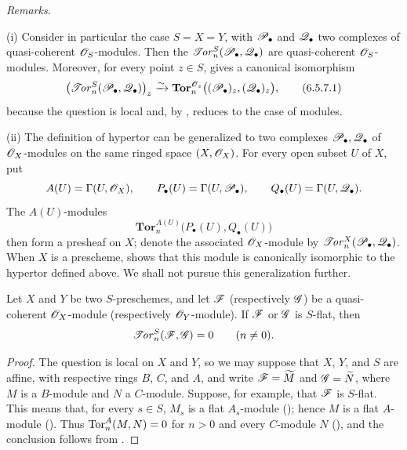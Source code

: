 \begin{env}[6.5.7]
\label{III.6.5.7}
\emph{Remarks.}

\textnormal{(i)} Consider in particular the case $S=X=Y$, with
$\mathscr{P}_\bullet$ and $\mathscr{Q}_\bullet$ two complexes of
quasi-coherent $\mathscr{O}_S$-modules.  Then the
$\mathscr{T}\!\mathit{or}_n^S(\mathscr{P}_\bullet,\mathscr{Q}_\bullet)$ are quasi-coherent
$\mathscr{O}_S$-modules.  Moreover, for every point $z\in S$,
 gives a canonical isomorphism
\[
  \bigl(\mathscr{T}\!\mathit{or}_n^S(\mathscr{P}_\bullet,\mathscr{Q}_\bullet)\bigr)_z
  \xrightarrow{\sim}
  \mathbf{Tor}_n^{\mathscr{O}_z}
  \bigl((\mathscr{P}_\bullet)_z,(\mathscr{Q}_\bullet)_z\bigr),
  \tag{6.5.7.1}\label{III.6.5.7.1}
\]
because the question is local and, by ,
reduces to the case of modules.

\textnormal{(ii)} The definition of hypertor can be generalized
to two complexes $\mathscr{P}_\bullet,\mathscr{Q}_\bullet$ of
$\mathscr{O}_X$-modules on the same ringed space $(X,\mathscr{O}_X)$.  For
every open subset $U$ of $X$, put
\[
  A(U)=\Gamma(U,\mathscr{O}_X),\qquad
  P_\bullet(U)=\Gamma(U,\mathscr{P}_\bullet),\qquad
  Q_\bullet(U)=\Gamma(U,\mathscr{Q}_\bullet).
\]
The $A(U)$-modules
\[
  \mathbf{Tor}_n^{A(U)}\bigl(P_\bullet(U),Q_\bullet(U)\bigr)
\]
then form a presheaf on $X$; denote the associated
$\mathscr{O}_X$-module by
$\mathscr{T}\!\mathit{or}_n^X(\mathscr{P}_\bullet,\mathscr{Q}_\bullet)$.  When $X$ is a
prescheme,  shows that this module is
canonically isomorphic to the hypertor defined above.  We shall
not pursue this generalization further.
\end{env}

\begin{proposition}[6.5.8]
\label{III.6.5.8}
Let $X$ and $Y$ be two $S$-preschemes, and let $\mathscr{F}$
(respectively $\mathscr{G}$) be a quasi-coherent $\mathscr{O}_X$-module
(respectively $\mathscr{O}_Y$-module).  If $\mathscr{F}$ or $\mathscr{G}$ is
$S$-flat, then
\[
  \mathscr{T}\!\mathit{or}_n^S(\mathscr{F},\mathscr{G})=0\qquad(n\ne0).
\]
\end{proposition}

\begin{proof}
The question is local on $X$ and $Y$, so we may suppose that
$X$, $Y$, and $S$ are affine, with respective rings $B$, $C$,
and $A$, and write $\mathscr{F}=\widetilde M$ and
$\mathscr{G}=\widetilde N$, where $M$ is a $B$-module and $N$ a
$C$-module.  Suppose, for example, that $\mathscr{F}$ is $S$-flat.
This means that, for every $s\in S$, $M_s$ is a flat
$A_s$-module (); hence $M$ is a flat
$A$-module ().  Thus
$\operatorname{Tor}_n^A(M,N)=0$ for $n>0$ and every $C$-module $N$
(), and the conclusion follows from
.
\end{proof}


